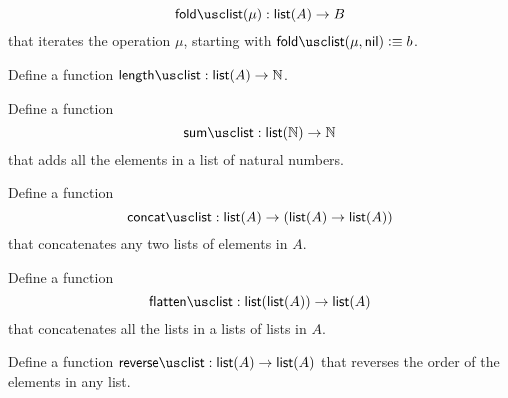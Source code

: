 \begin{exercises}
\begin{subexenum}
    \begin{equation*}
      \foldlist(\mu) : \lst(A)\to B
    \end{equation*}
    that iterates the operation $\mu$, starting with $\foldlist(\mu,\nil)\defeq b$.
  \item Define a function $\lengthlist:\lst(A)\to\N$.
  \item Define a function
    \begin{equation*}
      \sumlist : \lst(\N) \to \N
    \end{equation*}
    that adds all the elements in a list of natural numbers.
  \item Define a function
    \begin{equation*}
      \concatlist : \lst(A) \to (\lst(A) \to \lst(A))
    \end{equation*}
    that concatenates any two lists of elements in $A$.
  \item Define a function
    \begin{equation*}
      \flattenlist : \lst(\lst(A)) \to \lst(A)
    \end{equation*}
    that concatenates all the lists in a lists of lists in $A$.
  \item Define a function $\reverselist : \lst(A) \to \lst(A)$ that reverses the order of the elements in any list.
  \end{subexenum}
\end{exercises}
